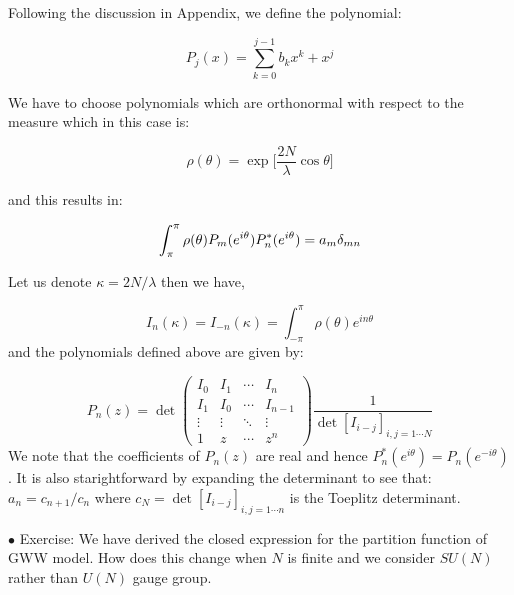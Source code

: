 \documentclass[11pt]{article}
\begin{document}
Following the discussion in Appendix, we define the polynomial:

\begin{equation}
	P_{j}(x) = \sum_{k=0}^{j-1} b_{k} x^{k} + x^{j} 
\end{equation} 


We have to choose polynomials which are orthonormal with respect to the measure which in this case is:

\begin{equation}
	\rho(\theta) = \exp\Big[\frac{2N}{\lambda} \cos \theta \Big]
\end{equation}

and this results in:

\begin{equation}
	\int_{\-\pi}^{\pi} \rho(\theta) P_{m}(e^{i\theta}) P_{n}^{*}(e^{i\theta}) = a_{m} \delta_{mn}
\end{equation}


Let us denote $\kappa = 2N/\lambda$ then we have, 

\begin{equation}
	I_{n}(\kappa) = I_{-n}(\kappa) = \int_{-\pi}^{\pi} \rho(\theta) e^{i n \theta} 
\end{equation}
and the polynomials defined above are given by:

\begin{equation}
	P_{n}(z) = \det
	\begin{pmatrix}
		I_0 & I_1 & \cdots & I_n \\
		I_1 & I_0 & \cdots & I_{n-1} \\
		\vdots  & \vdots  & \ddots & \vdots  \\
		1 & z & \cdots & z^n 
			\end{pmatrix}
		 \frac{1}{\det [I_{i-j}]_{i,j = 1 \cdots N}}
\end{equation}
We note that the coefficients of $P_{n}(z)$ are real and hence $P_{n}^{*}(e^{i\theta}) = P_{n}(e^{-i\theta})$. It is also starightforward by expanding the determinant to see that: $a_{n} = c_{n+1}/c_{n}$ where $c_{N} = \det [I_{i-j}]_{i,j = 1 \cdots n}$ is the Toeplitz determinant. 



\begin{mdframed}[backgroundcolor=blue!3] 
	\textsc{} 
	$\bullet$ Exercise: We have derived the closed expression for the partition function of GWW model. How does this change when 
	$N$ is finite and we consider $SU(N)$ rather than $U(N)$ gauge group. \\ 
\end{mdframed} 
\end{document}
